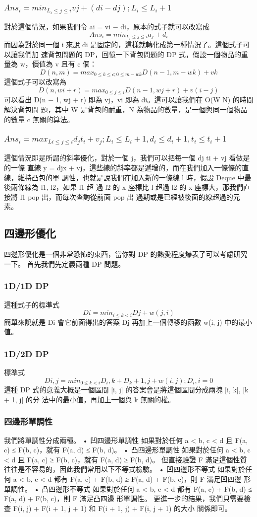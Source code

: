 \documentclass{article}
\begin{document}
\subsubsection{$Ans_i = min_{L_i ≤ j ≤ i} vj + (di − dj ) ; L_i ≤ L_i +1$}
對於這個情況，如果我們令 ai = vi − di，原本的式子就可以改寫成
$$ Ans_i = min_{L_i ≤ j ≤ i} a_j + d_i$$
而因為對於同一個 i 來說 di 是固定的，這樣就轉化成第一種情況了。這個式子可以讓我們加
速背包問題的 DP，回憶一下背包問題的 DP 式，假設一個物品的重量為 w，價值為 v 且有
c 個：
$$ D(n, m) = max_{0≤k≤c;0≤m−wk} D(n − 1, m − wk) + vk$$
這個式子可以改寫為
$$ D(n, wi + r) = max_{0≤j≤i} D(n − 1, wj + r) + v(i − j)$$
可以看出 D(n − 1, wj + r) 即為 vj，vi 即為 di。這可以讓我們在 O(W N) 的時間解決背包問
題，其中 W 是背包的耐重，N 為物品的數量，是一個與同一個物品的數量 c 無關的算法。
\subsubsection{$Ans_i = max_{Li≤j≤i} d_j t_i + v_j; L_i ≤ L_i +1, d_i ≤ d_i +1, t_i ≤ t_i +1$}
這個情況即是所謂的斜率優化，對於一個 j，我們可以把每一個 dj ti + vj 看做是的一條
直線 y = djx + vj，這些線的斜率都是遞增的，而在我們加入一條條的直線，維持凸包的單
調性，也就是說我們在加入新的一條線 l 時，假設 Deque 中最後兩條線為 l1, l2，如果 l1 超
過 l2 的 x 座標比 l 超過 l2 的 x 座標大，那我們直接將 l1 pop 出，而每次查詢從前面 pop 出
過期或是已經被後面的線超過的元素。

\subsection{四邊形優化}
四邊形優化是一個非常恐怖的東西，當你對 DP 的熱愛程度爆表了可以考慮研究一下。
首先我們先定義兩種 DP 問題。
\subsubsection{1D/1D DP}
這種式子的標準式
$$Di = min_{i≤k<i} Dj + w(j, i)$$
簡單來說就是 Di 會它前面得出的答案 Dj 再加上一個轉移的函數 w(i, j) 中的最小值。
\subsubsection{1D/2D DP}
標準式
$$Di,j = min_{0≤k<i} D_i,k + D_k +1,j + w(i, j) ; D_i,i = 0 $$
這種 DP 式的意義大概是一個區間 [i, j] 的答案會是將這個區間分成兩塊 [i, k], [k + 1, j] 的分
法中的最小值，再加上一個與 k 無關的權。
\subsubsection{四邊形單調性}
我們將單調性分成兩種。
• 凹四邊形單調性
如果對於任何 a < b, c < d 且 F(a, c) ≤ F(b, c)，就有 F(a, d) ≤ F(b, d)。
• 凸四邊形單調性
如果對於任何 a < b, c < d 且 F(a, c) ≥ F(b, c)，就有 F(a, d) ≥ F(b, d)。
但直接驗證 F 滿足這個性質往往是不容易的，因此我們常用以下不等式檢驗。
• 凹四邊形不等式
如果對於任何 a < b, c < d 都有 F(a, c) + F(b, d) ≥ F(a, d) + F(b, c)，則 F 滿足凹四邊
形單調性。
• 凸四邊形不等式
如果對於任何 a < b, c < d 都有 F(a, c) + F(b, d) ≤ F(a, d) + F(b, c)，則 F 滿足凸四邊
形單調性。
更進一步的結果，我們只需要檢查 F(i, j) + F(i + 1, j + 1) 和 F(i + 1, j) + F(i, j + 1) 的大小
關係即可。
\end{document}
